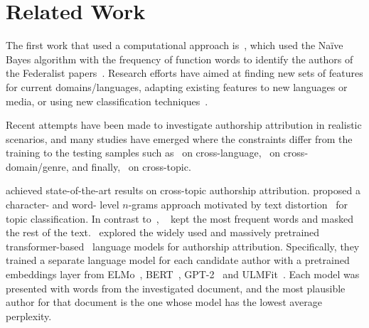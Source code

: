 \documentclass[11pt]{article}
\begin{document}
\section{Related Work}

The first work that used a computational approach is~\citep{Mosteller.f:1964}, which used the Na\"ive Bayes algorithm with the frequency of function words to identify the authors of the Federalist papers~\citep{Juola.p:2008}. Research efforts have aimed at finding new sets of features for current domains/languages, adapting existing features to new languages or media, or using new classification techniques~\citep{f2007identifying,Iqbal.F:2013,Stamatatos.E:2013, Sapkota.U:2014,sapkota2015not,Ding.S:2015,malik:2018}. 

Recent attempts have been made to investigate authorship attribution in realistic scenarios, and many studies have emerged where the constraints differ from the training to the testing samples such as~\citep{bogdanova-lazaridou-2014-cross} on cross-language,~\citep{goldstein2009person,custodio2019ensemble} on cross-domain/genre, and finally,~\citep{sundararajan2018represents,Stamatatos.E:2017,stamatatos2018masking,Barlas2020,Barlas2021} on cross-topic.

\citet{Stamatatos.E:2017, stamatatos2018masking,Barlas2020,Barlas2021} achieved state-of-the-art results on cross-topic authorship attribution. 
\citep{Stamatatos.E:2017, stamatatos2018masking} proposed a character- and word- level $n$-grams approach motivated by text distortion~\citep{granados2012contextual} for topic classification. In contrast to~\citep{granados2012contextual}, ~\citeauthor{stamatatos2018masking} kept the most frequent words and masked the rest of the text.~\citet{Barlas2020,Barlas2021} explored the widely used and massively pretrained transformer-based~\citep{vaswani2017attention} language models for authorship attribution. Specifically, they trained a separate language model for each candidate author with a pretrained embeddings layer from ELMo~\citep{peters-etal-2018-elmo}, BERT~\citep{devlin2019bert}, GPT-2~\citep{radford2019language} and ULMFit~\citep{howard2018universal}. Each model was presented with words from the investigated document, and the most plausible author for that document is the one whose model has the lowest average perplexity.
\end{document}
